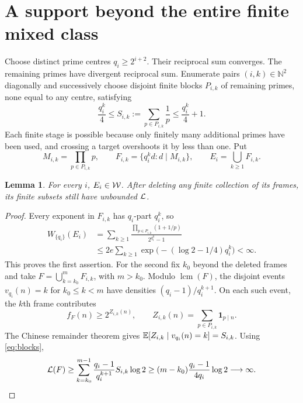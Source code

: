 \documentclass[11pt,a4paper]{article}
\newtheorem{lemma}[theorem]{Lemma}
\theoremstyle{definition}\newtheorem{definition}[theorem]{Definition}
\theoremstyle{remark}\newtheorem{remark}[theorem]{Remark}
\newcommand{\N}{\mathbb N}\newcommand{\Z}{\mathbb Z}\newcommand{\Q}{\mathbb Q}\newcommand{\R}{\mathbb R}
\DeclareMathOperator{\lcm}{lcm}
\begin{document}
\section{A support beyond the entire finite mixed class}
Choose distinct prime centres $q_i\ge2^{i+2}$. Their reciprocal sum converges. The remaining primes have divergent reciprocal sum. Enumerate pairs $(i,k)\in\N^2$ diagonally and successively choose disjoint finite blocks $P_{i,k}$ of remaining primes, none equal to any centre, satisfying
\begin{equation}\label{eq:blocks}
 \frac{q_i^k}{4}\le S_{i,k}:=\sum_{p\in P_{i,k}}\frac1p
 \le\frac{q_i^k}{4}+1.
\end{equation}
Each finite stage is possible because only finitely many additional primes have been used, and crossing a target overshoots it by less than one. Put
\[
 M_{i,k}=\prod_{p\in P_{i,k}}p,\qquad
 F_{i,k}=\{q_i^k d:d\mid M_{i,k}\},\qquad
 E_i=\bigcup_{k\ge1}F_{i,k}.
\]

\begin{lemma}\label{lem:centre}
For every $i$, $E_i\in\mathcal W$. After deleting any finite collection of its frames, its finite subsets still have unbounded $\mathcal L$.
\end{lemma}
\begin{proof}
Every exponent in $F_{i,k}$ has $q_i$-part $q_i^k$, so
\begin{align*}
 W_{\{q_i\}}(E_i)
 &=\sum_{k\ge1}\frac{\prod_{p\in P_{i,k}}(1+1/p)}{2^{q_i^k}-1}\\
 &\le2e\sum_{k\ge1}
 \exp\bigl(- (\log2-1/4)q_i^k\bigr)<\infty.
\end{align*}
This proves the first assertion.
For the second fix $k_0$ beyond the deleted frames and take
$F=\bigcup_{k=k_0}^mF_{i,k}$, with $m>k_0$.
Modulo $\lcm(F)$, the disjoint events $v_{q_i}(n)=k$ for $k_0\le k<m$ have densities $(q_i-1)/q_i^{k+1}$.
On each such event, the $k$th frame contributes
\[
 f_F(n)\ge2^{Z_{i,k}(n)},\qquad
 Z_{i,k}(n)=\sum_{p\in P_{i,k}}\mathbf1_{p\mid n}.
\]
The Chinese remainder theorem gives
$\mathbb E[Z_{i,k}\mid v_{q_i}(n)=k]=S_{i,k}$.
Using \eqref{eq:blocks},
\begin{equation}\label{eq:centrelog}
 \mathcal L(F)\ge\sum_{k=k_0}^{m-1}
 \frac{q_i-1}{q_i^{k+1}}S_{i,k}\log2
 \ge(m-k_0)\frac{q_i-1}{4q_i}\log2\longrightarrow\infty.
\end{equation}
\end{proof}
\end{document}
